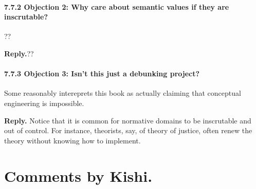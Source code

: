 \documentclass[
10pt, %
a4paper, %
twocolumn, %
landscape %
]{article}
\begin{document}
\paragraph{7.7.2 Objection 2: Why care about semantic values if they are inscrutable?}
??

\noindent \textbf{Reply.}??

\paragraph{7.7.3 Objection 3: Isn't this just a debunking project?}
Some reasonably intereprets this book as actually claiming that conceptual engineering is impossible.

\noindent \textbf{Reply.} Notice that it is common for normative domains to be inscrutable and out of control. For instance, theorists, say, of theory of justice, often renew the theory without knowing how to implement.
\section*{Comments by Kishi.}



\end{document}
